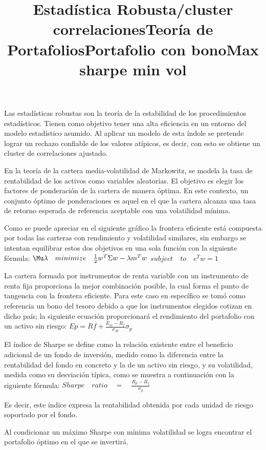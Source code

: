 
\title{Estad\'istica Robusta/cluster correlaciones}
Las estad\'isticas robustas son la teor\'ia de la estabilidad de los procedimientos estad\'isticos. Tienen como objetivo tener una alta eficiencia en un entorno del modelo estad\'istico asumido. Al aplicar un modelo de esta \'indole se pretende lograr un rechazo confiable de los valores at\'ipicos, es decir, con esto se obtiene un cluster de correlaciones ajustado. 

\title{Teor\'ia de Portafolios}
En la teor\'ia de la cartera media-volatilidad de Markowitz, se modela la tasa de rentabilidad de los activos como variables aleatorias. El objetivo es elegir los factores de ponderaci\'on de la cartera de manera \'optima. En este contexto, un conjunto \'optimo de ponderaciones es aquel en el que la cartera alcanza una tasa de retorno esperada de referencia aceptable con una volatilidad m\'inima. 

Como se puede apreciar en el siguiente gr\'afico la frontera eficiente est\'a compuesta por todas las carteras con rendimiento y volatilidad similares, sin embargo se intentan equilibrar estos dos objetivos en una sola funci\'on con la siguiente f\'ormula: 
$\Mu \lambda \quad minimize\quad \frac { 1 }{ 2 } { w }^{ T }\Sigma { w }-\lambda { m }^{ T }{w}$
$subject\quad to\quad { e }^{ T }{w}=1$

\title{Portafolio con bono}
La cartera formada por instrumentos de renta variable con un instrumento de renta fija proporciona  la  mejor  combinaci\'on  posible, la cual forma el punto de tangencia con la frontera eficiente. Para este caso en espec\'ifico se tom\'o como referencia un bono del tesoro debido a que los instrumentos elegidos cotizan en dicho pa\'is; la siguiente ecuaci\'on proporcionar\'a  el rendimiento del portafolio con un activo sin riesgo: 
$Ep=Rf+\frac { E_m-R_f }{ { \sigma  }_{ M } } { \sigma  }_{ p }$

\title{Max sharpe min vol}
El índice de Sharpe se define como la relaci\'on existente entre el beneficio adicional de un fondo de inversi\'on, medido como la diferencia entre la rentabilidad del fondo en concreto y la de un activo sin riesgo, y su volatilidad, medida como su desviaci\'on t\'ipica, como se muestra a continuaci\'on con la siguiente f\'ormula: 
$Sharpe\quad ratio\quad =\quad \frac { R_p-R_f }{ \sigma_p  }$

Es decir, este \'indice expresa la rentabilidad obtenida por cada unidad de riesgo soportado por el fondo. 

Al condicionar un m\'aximo Sharpe con m\'inima volatilidad se logra encontrar el portafolio \'optimo en el que se invertir\'a. 

